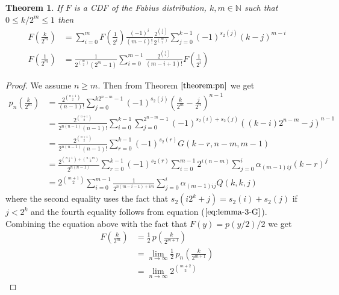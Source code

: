 \documentclass{article}
\newtheorem{theorem}{Theorem}
\begin{document}
\begin{theorem}
\label{theorem:main}
If $F$ is a CDF of the Fabius distribution, $k, m \in \mathbb{N}$ such that $0 \le k/2^m \le 1$ then
\begin{align}
F\left(\frac{k}{2^m}\right) 
&=
  \sum_{i=0}^{m}
    F\left(\frac{1}{2^i}\right) 
    \frac{(-1)^i}
         {(m-i)!}
    \frac{2^{\binom{i}{2}}}
         {2^{\binom{m}{2}}}
    \sum_{j=0}^{k-1}
    (-1)^{s_2(j)}
    \left(k-j\right)^{m-i} \\
F\left(\frac{1}{2^m}\right)
&= 
  \frac{1}{2^{\binom{m}{2}}(2^m-1)}
  \sum_{i=0}^{m-1}
    \frac{2^{\binom{i}{2}}}{(m-i+1)!}
    F\left(\frac{1}{2^i}\right)
\end{align}
\end{theorem}
\begin{proof}
We assume $n \ge m$. Then from Theorem $\ref{theorem:pn}$ we get
\begin{align*}
p_n\left(\frac{k}{2^m}\right)
&=
  \frac{2^{\binom{n+1}{2}}}
       {(n-1)!}
  \sum_{j=0}^{k2^{n-m}-1}
    (-1)^{s_2(j)}
    \left(\frac{k}{2^m}-\frac{j}{2^n}\right)^{n-1} \\
&=
  \frac{2^{\binom{n+1}{2}}}
       {2^{n(n-1)}(n-1)!}
  \sum_{i=0}^{k-1}
    \sum_{j=0}^{2^{n-m}-1}
      (-1)^{s_2(i) + s_2(j)}
      \left((k-i)2^{n-m}-j\right)^{n-1} \\
&=
  \frac{2^{\binom{n+1}{2}}}
       {2^{n(n-1)}(n-1)!}
  \sum_{r=0}^{k-1}
    (-1)^{s_2(r)}
    G(k-r, n-m, m-1) \\
&=
  \frac{2^{\binom{n+1}{2} + \binom{n-m}{2}}}
       {2^{n(n-1)}}
  \sum_{r=0}^{k-1}
      (-1)^{s_2(r)}
      \sum_{i=0}^{m-1}
        2^{i(n-m)}
        \sum_{j=0}^{i}
          \alpha_{(m-1)ij}
          (k-r)^j \\
&=
  2^{\binom{m+1}{2}}
  \sum_{i=0}^{m-1}
    \frac{1}{2^{n(m-i-1) + im}}
    \sum_{j=0}^{i}
      \alpha_{(m-1)ij}
      Q(k, k, j)
\end{align*}
where the second equality uses the fact that $s_2(i2^k+j) = s_2(i) + s_2(j)$ if $j < 2^k$ and the fourth equality follows from equation ($\ref{eq:lemma-3-G}$). Combining the equation above with the fact that $F(y) = p(y/2)/2$ we get
\begin{align*}
F\left(\frac{k}{2^m}\right)
&=
  \frac{1}{2} \, p\left(\frac{k}{2^{m+1}}\right) \\
&=
  \lim_{n \to \infty}
    \frac{1}{2} \, p_n\left(\frac{k}{2^{m+1}}\right) \\
&=
  \lim_{n \to \infty}
    2^{\binom{m+2}{2}}

\end{align*}
\end{proof}
\end{document}
